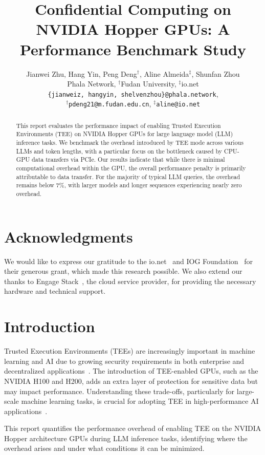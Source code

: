 \documentclass{article}
\title{Confidential Computing on NVIDIA Hopper GPUs: A Performance Benchmark Study}
\author{
  Jianwei Zhu,
  Hang Yin,
  Peng Deng$^\dagger$,
  Aline Almeida$^\ddagger$,
  Shunfan Zhou \\
  Phala Network, $^\dagger$Fudan University, $^\ddagger$io.net \\
  \texttt{\{jianweiz, hangyin, shelvenzhou\}@phala.network}, \\
  \texttt{$^\dagger$pdeng21@m.fudan.edu.cn},
  \texttt{$^\ddagger$aline@io.net}
}
\begin{document}
\maketitle

\begin{abstract}
    This report evaluates the performance impact of enabling Trusted Execution Environments (TEE) on NVIDIA Hopper GPUs for large language model (LLM) inference tasks. We benchmark the overhead introduced by TEE mode across various LLMs and token lengths, with a particular focus on the bottleneck caused by CPU-GPU data transfers via PCIe. Our results indicate that while there is minimal computational overhead within the GPU, the overall performance penalty is primarily attributable to data transfer. For the majority of typical LLM queries, the overhead remains below 7\%, with larger models and longer sequences experiencing nearly zero overhead.
\end{abstract}

\section*{Acknowledgments}

We would like to express our gratitude to the io.net~\cite{ionet} and IOG Foundation~\cite{iog} for their generous grant, which made this research possible. We also extend our thanks to Engage Stack~\cite{engagestack}, the cloud service provider, for providing the necessary hardware and technical support.

\section{Introduction}

Trusted Execution Environments (TEEs) are increasingly important in machine learning and AI due to growing security requirements in both enterprise and decentralized applications~\cite{sabt2015trusted, matetic2018delegatee, ayoade2018decentralized}. The introduction of TEE-enabled GPUs, such as the NVIDIA H100 and H200, adds an extra layer of protection for sensitive data but may impact performance. Understanding these trade-offs, particularly for large-scale machine learning tasks, is crucial for adopting TEE in high-performance AI applications~\cite{yudha2022lite, wang2024confidential}.

This report quantifies the performance overhead of enabling TEE on the NVIDIA Hopper architecture GPUs during LLM inference tasks, identifying where the overhead arises and under what conditions it can be minimized.
\end{document}
